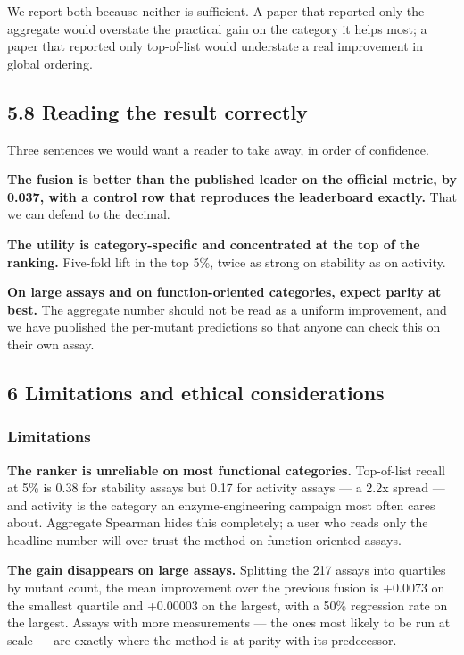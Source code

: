 We report both because neither is sufficient. A paper that reported only the aggregate would
overstate the practical gain on the category it helps most; a paper that reported only top-of-list would
understate a real improvement in global ordering.

\hypertarget{reading-the-result-correctly}{%
\subsection{5.8 Reading the result correctly}\label{reading-the-result-correctly}}

Three sentences we would want a reader to take away, in order of confidence.

\textbf{The fusion is better than the published leader on the official metric, by 0.037, with a control row
that reproduces the leaderboard exactly.} That we can defend to the decimal.

\textbf{The utility is category-specific and concentrated at the top of the ranking.} Five-fold lift in the
top 5\%, twice as strong on stability as on activity.

\textbf{On large assays and on function-oriented categories, expect parity at best.} The aggregate number
should not be read as a uniform improvement, and we have published the per-mutant predictions so that
anyone can check this on their own assay.

\hypertarget{limitations-and-ethical-considerations}{%
\subsection{6 Limitations and ethical considerations}\label{limitations-and-ethical-considerations}}

\hypertarget{limitations}{%
\subsubsection{Limitations}\label{limitations}}

\textbf{The ranker is unreliable on most functional categories.} Top-of-list recall at 5\% is 0.38 for
stability assays but 0.17 for activity assays --- a 2.2x spread --- and activity is the category an
enzyme-engineering campaign most often cares about. Aggregate Spearman hides this completely; a user
who reads only the headline number will over-trust the method on function-oriented assays.

\textbf{The gain disappears on large assays.} Splitting the 217 assays into quartiles by mutant count, the
mean improvement over the previous fusion is +0.0073 on the smallest quartile and +0.00003 on the
largest, with a 50\% regression rate on the largest. Assays with more measurements --- the ones most
likely to be run at scale --- are exactly where the method is at parity with its predecessor.

